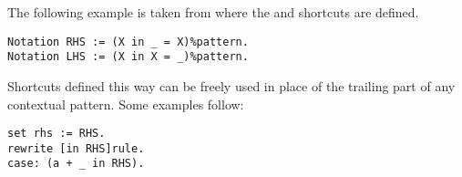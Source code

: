 The following example is taken from  where the 
 and  shortcuts are defined.

\begin{lstlisting}
Notation RHS := (X in _ = X)%pattern.
Notation LHS := (X in X = _)%pattern.
\end{lstlisting}

Shortcuts defined this way can be freely used in place of the
trailing  part of any contextual
pattern.
Some examples follow:

\begin{lstlisting}
set rhs := RHS.
rewrite [in RHS]rule.
case: (a + _ in RHS).
\end{lstlisting}


